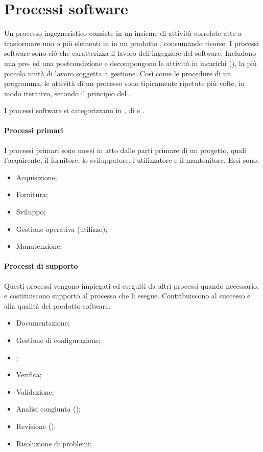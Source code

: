 \section{Processi software}
Un \gls{processo} ingegneristico consiste in un insieme di attività correlate atte a trasformare uno o più elementi in  in un prodotto , consumando risorse. I processi software sono ciò che caratterizza il lavoro dell'ingegnere del software. Includono una pre- ed una postcondizione e decompongono le attività in incarichi (), la più piccola unità di lavoro soggetta a gestione. Così come le procedure di un programma, le attività di un processo sono tipicamente ripetute più volte, in modo iterativo, secondo il principio del .


I processi software si categorizzano in , di  e .

\paragraph{Processi primari}
I processi primari sono messi in atto dalle parti primare di un progetto, quali l'acquirente, il fornitore, lo sviluppatore, l'utilizzatore e il mantenitore. Essi sono:

\begin{itemize}
	\item Acquisizione;
	\item Fornitura;
	\item Sviluppo;
	\item Gestione operativa (utilizzo);
	\item Manutenzione;
\end{itemize}

\paragraph{Processi di supporto}
Questi processi vengono impiegati ed eseguiti da altri processi quando necessario, e costituiscono supporto al processo che li esegue. Contribuiscono al successo e alla qualità del prodotto software.

\begin{itemize}
	\item Documentazione;
	\item Gestione di configurazione;
	\item {};
	\item Verifica;
	\item Validazione;
	\item Analisi congiunta ();
	\item Revisione ();
	\item Risoluzione di problemi;
\end{itemize}

